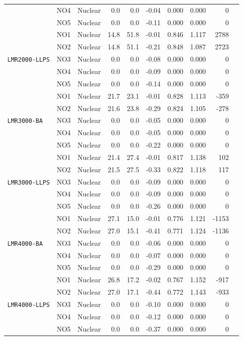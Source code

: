 \begin{table}[htbp]
\begin{tabular}{lllrrrrrrr}
 & NO4 & Nuclear & 0.0 & 0.0 & -0.04 & 0.000 & 0.000 & 0 \\
 & NO5 & Nuclear & 0.0 & 0.0 & -0.11 & 0.000 & 0.000 & 0 \\
\midrule
\multirow{5}{*}{\texttt{LMR2000-LLPS}} & NO1 & Nuclear & 14.8 & 51.8 & -0.01 & 0.846 & 1.117 & 2788 \\
 & NO2 & Nuclear & 14.8 & 51.1 & -0.21 & 0.848 & 1.087 & 2723 \\
 & NO3 & Nuclear & 0.0 & 0.0 & -0.08 & 0.000 & 0.000 & 0 \\
 & NO4 & Nuclear & 0.0 & 0.0 & -0.09 & 0.000 & 0.000 & 0 \\
 & NO5 & Nuclear & 0.0 & 0.0 & -0.14 & 0.000 & 0.000 & 0 \\
\midrule
\multirow{5}{*}{\texttt{LMR3000-BA}} & NO1 & Nuclear & 21.7 & 23.1 & -0.01 & 0.828 & 1.113 & -359 \\
 & NO2 & Nuclear & 21.6 & 23.8 & -0.29 & 0.824 & 1.105 & -278 \\
 & NO3 & Nuclear & 0.0 & 0.0 & -0.05 & 0.000 & 0.000 & 0 \\
 & NO4 & Nuclear & 0.0 & 0.0 & -0.05 & 0.000 & 0.000 & 0 \\
 & NO5 & Nuclear & 0.0 & 0.0 & -0.22 & 0.000 & 0.000 & 0 \\
\midrule
\multirow{5}{*}{\texttt{LMR3000-LLPS}} & NO1 & Nuclear & 21.4 & 27.4 & -0.01 & 0.817 & 1.138 & 102 \\
 & NO2 & Nuclear & 21.5 & 27.5 & -0.33 & 0.822 & 1.118 & 117 \\
 & NO3 & Nuclear & 0.0 & 0.0 & -0.09 & 0.000 & 0.000 & 0 \\
 & NO4 & Nuclear & 0.0 & 0.0 & -0.09 & 0.000 & 0.000 & 0 \\
 & NO5 & Nuclear & 0.0 & 0.0 & -0.26 & 0.000 & 0.000 & 0 \\
\midrule
\multirow{5}{*}{\texttt{LMR4000-BA}} & NO1 & Nuclear & 27.1 & 15.0 & -0.01 & 0.776 & 1.121 & -1153 \\
 & NO2 & Nuclear & 27.0 & 15.1 & -0.41 & 0.771 & 1.124 & -1136 \\
 & NO3 & Nuclear & 0.0 & 0.0 & -0.06 & 0.000 & 0.000 & 0 \\
 & NO4 & Nuclear & 0.0 & 0.0 & -0.07 & 0.000 & 0.000 & 0 \\
 & NO5 & Nuclear & 0.0 & 0.0 & -0.29 & 0.000 & 0.000 & 0 \\
\midrule
\multirow{5}{*}{\texttt{LMR4000-LLPS}} & NO1 & Nuclear & 26.8 & 17.2 & -0.02 & 0.767 & 1.152 & -917 \\
 & NO2 & Nuclear & 27.0 & 17.1 & -0.44 & 0.772 & 1.143 & -933 \\
 & NO3 & Nuclear & 0.0 & 0.0 & -0.10 & 0.000 & 0.000 & 0 \\
 & NO4 & Nuclear & 0.0 & 0.0 & -0.12 & 0.000 & 0.000 & 0 \\
 & NO5 & Nuclear & 0.0 & 0.0 & -0.37 & 0.000 & 0.000 & 0 \\
\bottomrule
\end{tabular}
\end{table}